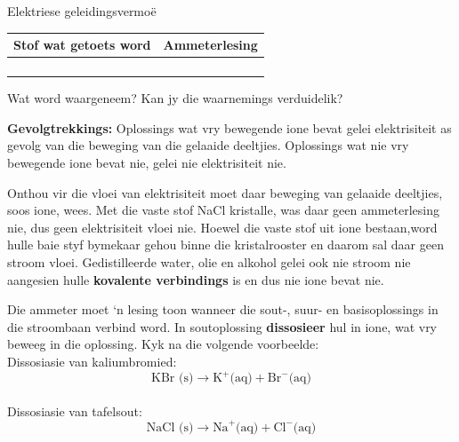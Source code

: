 \begin{g_experiment}{Elektriese geleidingsvermo\"{e}}
\begin{table}[H]
\begin{center}
    \noindent
      \begin{tabular}{|l|l|}\hline
        Stof wat getoets word &
        Ammeterlesing \\ \hline
         &
       \\ \hline
         &
       \\ \hline
         &
       \\ \hline
         &
    \\ \hline
    \end{tabular}
      \end{center}
\end{table}
    \par
  \par 
        \label{m38720*id339669}Wat word waargeneem?  Kan jy die waarnemings verduidelik?\par 
        \label{m38720*id339864}\noindent{}\textbf{Gevolgtrekkings:}
          \newline
Oplossings wat vry bewegende ione bevat gelei elektrisiteit as gevolg van die beweging van die gelaaide deeltjies. Oplossings wat nie vry bewegende ione bevat nie, gelei nie elektrisiteit nie.
\end{g_experiment}
Onthou vir die vloei van elektrisiteit moet daar beweging van gelaaide deeltjies, soos ione, wees. Met die vaste stof NaCl kristalle, was daar geen ammeterlesing nie, dus geen elektrisiteit vloei nie. Hoewel die vaste stof uit ione bestaan,word hulle baie styf bymekaar gehou binne die kristalrooster en daarom sal daar geen stroom vloei. Gedistilleerde water, olie en alkohol gelei ook nie stroom nie aangesien hulle \textbf{kovalente verbindings} is en dus nie ione bevat nie.\par 
Die ammeter moet ‘n lesing toon wanneer die sout-, suur- en basisoplossings in die stroombaan verbind word.  In soutoplossing \textbf{dissosieer} hul in ione, wat vry beweeg in die oplossing. Kyk na die volgende voorbeelde:\\
Dissosiasie van kaliumbromied:\\
        \label{m38720*id339701}\nopagebreak\noindent        
    \begin{equation*}
    \text{KBr (s)} \to {\text{K}}^{+} \text{(aq)} + {\text{Br}}^{-} \text{(aq)}
      \end{equation*} \\
Dissosiasie van tafelsout:\\
        \label{m38720*id339737}\nopagebreak\noindent          
    \begin{equation*}
    \text{NaCl (s)}\to {\text{Na}}^{+} \text{(aq)} + {\text{Cl}}^{-} \text{(aq)}
      \end{equation*}\\
